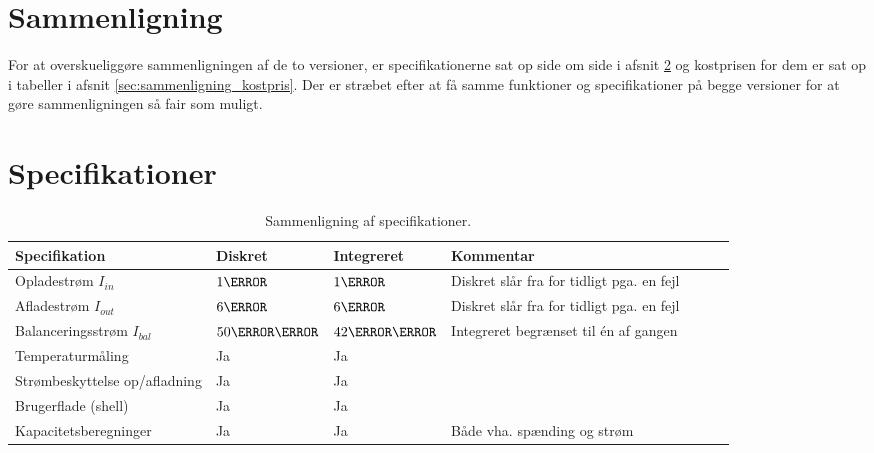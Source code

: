 \section{Sammenligning} \label{afs:sammenligning}
For at overskueliggøre sammenligningen af de to versioner, er specifikationerne sat op side om side i afsnit \ref{sec:sammenligning_specifikation} og kostprisen for dem er sat op i tabeller i afsnit \ref{sec:sammenligning_kostpris}. Der er stræbet efter at få samme funktioner og specifikationer på begge versioner for at gøre sammenligningen så fair som muligt. 

\section{Specifikationer} \label{sec:sammenligning_specifikation}

\begin{table}[h!]
	\small
	\centering
	\begin{threeparttable}
		\begin{tabular}{ l l l l l l l }
			\toprule
			\multicolumn{1}{l}{\textbf{Specifikation}}          &
			\multicolumn{1}{l}{\textbf{Diskret}}           &
			\multicolumn{1}{l}{\textbf{Integreret}}  &
			\multicolumn{1}{l}{\textbf{Kommentar}}   \\ 
			\hline
			Opladestrøm $I_{in}$           &  $1\ampere$            & $1\ampere$            &    Diskret slår fra for tidligt pga. en fejl\\
			Afladestrøm $I_{out}$          &   $6\ampere$           & $6\ampere$            &    Diskret slår fra for tidligt pga. en fejl\\
			Balanceringsstrøm $I_{bal}$    & $50\milli\ampere$     & $42\milli\ampere$     &  Integreret begrænset til én af gangen  \\
			Temperaturmåling               &   Ja                   &  Ja                   &    \\
			Strømbeskyttelse op/afladning  &   Ja                   &  Ja                   &    \\
			Brugerflade (shell)                        &   Ja                   &  Ja                   &    \\
			Kapacitetsberegninger                        &   Ja                   &  Ja                   &   Både vha. spænding og strøm\\

			\bottomrule
		\end{tabular}
		\caption{Sammenligning af specifikationer.}
		\label{tab:specifikationer}
	\end{threeparttable}
\end{table} 
\FloatBlock

